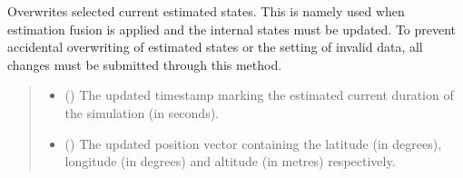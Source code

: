 \documentclass[letterpaper,10pt,english]{sphinxmanual}
\begin{document}
\begin{fulllineitems}
\begin{fulllineitems}
\label{\detokenize{modules/estimation/state:qnav.estimation.state.KalmanEstimatedState.update_estimates}}
\pysigstartsignatures
{}
\pysigstopsignatures
\sphinxAtStartPar
Overwrites selected current estimated states.
This is namely used when estimation fusion is applied and the
internal states must be updated. To prevent accidental overwriting of
estimated states or the setting of invalid data, all changes must be
submitted through this method.
\begin{quote}\begin{description}
\begin{itemize}
\item {} 
\sphinxAtStartPar
{} () \textendash{} The updated timestamp marking the estimated current
duration of the simulation (in seconds).

\item {} 
\sphinxAtStartPar
{} (\sphinxstyleliteralemphasis{\sphinxupquote{ (}}\sphinxstyleliteralemphasis{\sphinxupquote{)}}) \textendash{} The updated position vector containing the
latitude (in degrees), longitude (in degrees) and altitude
(in metres) respectively.


\end{itemize}
\end{description}
\end{quote}
\end{fulllineitems}
\end{fulllineitems}
\end{document}
